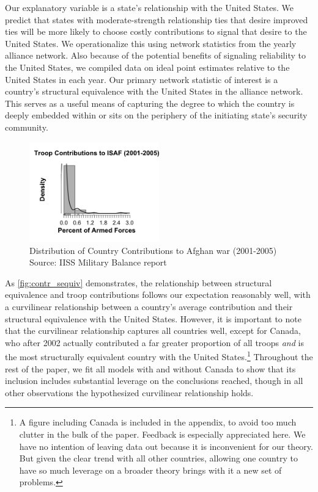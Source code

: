 \documentclass[12pt,letterpaper]{article}
\begin{document}
		Our explanatory variable is a state's relationship with the United States. We predict that states with moderate-strength relationship ties that desire improved ties will be more likely to choose costly contributions to signal that desire to the United States. We operationalize this using network statistics from the yearly alliance network. Also because of the potential benefits of signaling reliability to the United States, we compiled data on ideal point estimates relative to the United States in each year. Our primary network statistic of interest is a country's structural equivalence with the United States in the alliance network. This serves as a useful means of capturing the degree to which the country is deeply embedded within or sits on the periphery of the initiating state's security community.

			\begin{figure}[ht]
			\centering
				\includegraphics[width=0.5\textwidth]{figures/troops_hist_largebin.png}
			\caption{Distribution of Country Contributions to Afghan war (2001-2005) Source: IISS Military Balance report}
			\label{fig:troop_hist}
			\end{figure}

		As \ref{fig:contr_sequiv} demonstrates, the relationship between structural equivalence and troop contributions follows our expectation reasonably well, with a curvilinear relationship between a country's average contribution and their structural equivalence with the United States. However, it is important to note that the curvilinear relationship captures all countries well, except for Canada, who after 2002 actually contributed a far greater proportion of all troops \textit{and} is the most structurally equivalent country with the United States.\footnote{A figure including Canada is included in the appendix, to avoid too much clutter in the bulk of the paper. Feedback is especially appreciated here. We have no intention of leaving data out because it is inconvenient for our theory. But given the clear trend with all other countries, allowing one country to have so much leverage on a broader theory brings with it a new set of problems.} Throughout the rest of the paper, we fit all models with and without Canada to show that its inclusion includes substantial leverage on the conclusions reached, though in all other observations the hypothesized curvilinear relationship holds.
\end{document}
